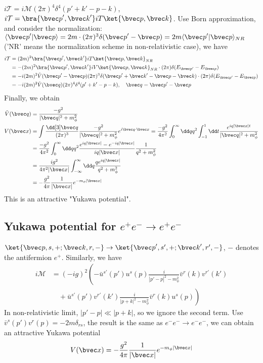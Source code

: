 $i\mathcal{T}=i\mathcal{M}(2\pi)^4 \delta^4(p'+k'-p-k)$, $i\mathcal{T} = \bra{{\bvec p}',{\bvec k}'}iT\ket{{\bvec p},{\bvec k}}$. Use Born approximation, and consider the normalization: $\langle{\bvec p}'|{\bvec p}\rangle=2m\cdot (2\pi)^3 \delta({\bvec p}'-{\bvec p}) = 2m \langle{\bvec p}'|{\bvec p}\rangle_{NR}$('NR' means the normalization scheme in non-relativistic case), we have
\begin{equation}
\begin{aligned} 
i\mathcal{T}&=(2m)^2\bra{{\bvec p}',{\bvec k}'}iT\ket{{\bvec p},{\bvec k}}_{NR}\\
& =-(2m)^2\bra{{\bvec p}',{\bvec k}'}iV\ket{{\bvec p},{\bvec k}}_{NR} \cdot (2\pi) \delta(E_{{\bvec p}'}-E_{\bvec p})
\\
& = -i(2m)^2 \tilde{V}({\bvec p}'-{\bvec p})(2\pi)^3 \delta({\bvec p}'+{\bvec k}'-{\bvec p}-{\bvec k})\cdot (2\pi) \delta(E_{{\bvec p}'}-E_{\bvec p})\\
&=-i(2m)^2 \tilde{V}(\bvec q) (2\pi)^4 \delta^4(p'+k'-p-k),\quad \bvec q={\bvec p}'-{\bvec p}
\end{aligned}
\end{equation}
Finally, we obtain
\begin{equation}
\begin{aligned}
\tilde{V}(\bvec q)&=\frac{-g^2}{|\bvec q|^2+m_\phi^2}\\
V({\bvec x})&=\int \frac{\dd[3]\bvec q}{(2\pi)^3} \frac{-g^2}{|\bvec q|^2+m_\phi^2}e^{i\bvec q\cdot {\bvec x}} =\frac{-g^2}{4\pi^2}\int_0^\infty \dd q q^2\int_{-1}^1 \dd t \frac{e^{iq|{\bvec x}|t}}{|\bvec q|^2+m_\phi^2}\\
&= \frac{-g^2}{4\pi^2}\int_0^\infty \dd q q^2\frac{e^{iq|{\bvec x}|}-e^{-iq|{\bvec x}|}}{iq|{\bvec x}|} \frac{1}{q^2+m_\phi^2}\\
&=\frac{ig^2}{4\pi^2|{\bvec x}|}\int_{-\infty}^\infty \dd q \frac{qe^{iq|{\bvec x}|}}{q^2+m_\phi^2}\\
&=-\frac{g^2}{4\pi}\frac{1}{|{\bvec x}|} e^{-m_\phi |{\bvec x}|}
\end{aligned}
\end{equation}
This is an attractive "Yukawa potential".
\subsection{\small Yukawa potential for $e^+e^-\rightarrow e^+e^-$}
$\ket{{\bvec p},s,+;{\bvec k},r,-}\rightarrow \ket{{\bvec p}',s',+;{\bvec k}',r',-}$, $-$ denotes the antifermion $e^+$. Similarly, we have
\begin{equation}
\begin{aligned}
i\mathcal{M}&=(-ig)^2 \left(
-\bar u^{s'}(p')u^s(p) \frac{i}{|p'-p|^2-m_\phi^2} \bar v^{r}(k) v^{r'}(k')\right.\\
&\left.\quad + \bar u^{s'}(p')v^{r'}(k') \frac{i}{|p+k|^2-m_\phi^2} \bar v^{r}(k) u^s(p)\right)
\end{aligned}
\end{equation}
In non-relativistic limit, $|p'-p|\ll |p+k|$, so we ignore the second term. Use $\bar v^s(p') v^r(p)=-2m \delta_{rs}$, the result is the same as $e^-e^-\rightarrow e^- e^-$, we can obtain an attractive Yukawa potential 
\[
V({\bvec x})=-\frac{g^2}{4\pi}\frac{1}{|{\bvec x}|} e^{-m_\phi |{\bvec x}|}
\]